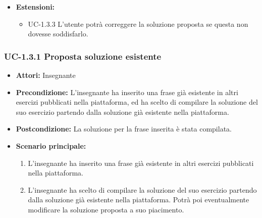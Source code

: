 \begin{itemize}
		
\item \textbf{Estensioni: }
		\begin{itemize}
		\item UC-1.3.3 L'utente potrà correggere la soluzione proposta se questa non dovesse soddisfarlo.
		\end{itemize}

\end{itemize}
\subsubsection{UC-1.3.1 Proposta soluzione esistente}
\begin{itemize}
\item \textbf{Attori: }Insegnante

\item \textbf{Precondizione: }L'insegnante ha inserito una frase già esistente in altri esercizi pubblicati nella piattaforma, ed ha scelto di compilare la soluzione del suo esercizio partendo dalla soluzione già esistente nella piattaforma.
\item \textbf{Postcondizione: }La soluzione per la frase inserita è stata compilata.
\item \textbf{Scenario principale: }
		\begin{enumerate}
		\item L'insegnante ha inserito una frase già esistente in altri esercizi pubblicati nella piattaforma.
		\item L'insegnante ha scelto di compilare la soluzione del suo esercizio partendo dalla soluzione già esistente nella piattaforma. Potrà poi eventualmente modificare la soluzione proposta a suo piacimento.
		\end{enumerate}
		
\end{itemize}
